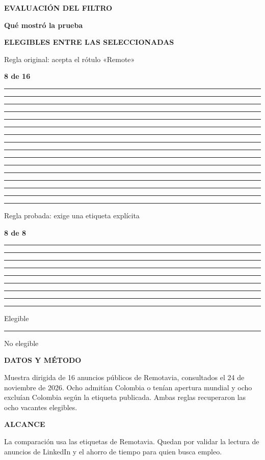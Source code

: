 \documentclass[a0,portrait]{a0poster}
\newcommand{\etiqueta}[2][uniRojo]{%
  {\sffamily\fontsize{28}{35}\selectfont\bfseries\color{#1}#2\par}}
\newcommand{\tituloSeccion}[1]{%
  {\rmfamily\fontsize{67}{74}\selectfont\bfseries\color{uniAzul}#1\par}}
\newcommand{\nota}[1]{%
  {\sffamily\fontsize{36}{48}\selectfont\color{secundario}#1\par}}
\newcommand{\panel}[2]{%
  \begingroup\setlength{\fboxsep}{1.5cm}%
  \noindent\colorbox{#1}{%
    \parbox[t]{\dimexpr\linewidth-2\fboxsep\relax}{\raggedright #2}}%
  \par\endgroup}
\newcommand{\segmento}[1]{%
  {\color{#1}\rule{1.43cm}{1.12cm}}\hspace{0.31cm}}
\newcommand{\ocho}[1]{%
  \segmento{#1}\segmento{#1}\segmento{#1}\segmento{#1}%
  \segmento{#1}\segmento{#1}\segmento{#1}\segmento{#1}}
\newcommand{\leyenda}[2]{%
  {\color{#1}\rule{0.7cm}{0.7cm}}\hspace{0.35cm}#2}
\begin{document}
\begin{minipage}[t]{0.443\linewidth}
  \vspace{0pt}\raggedright
  \etiqueta{EVALUACIÓN DEL FILTRO}
  \vspace{0.35cm}
  \tituloSeccion{Qué mostró la prueba}
  \vspace{1.1cm}
  \panel{azulClaro}{%
    \etiqueta[uniAzul]{ELEGIBLES ENTRE LAS SELECCIONADAS}
    \vspace{0.8cm}
    \nota{Regla original: acepta el rótulo «Remote»}
    \vspace{0.28cm}
    {\rmfamily\fontsize{76}{80}\selectfont\bfseries\color{uniAzul}
      8 de 16\par}
    \vspace{0.38cm}
    \ocho{uniAzul}\ocho{uniRojo}\par
    \vspace{1.2cm}
    \nota{Regla probada: exige una etiqueta explícita}
    \vspace{0.28cm}
    {\rmfamily\fontsize{76}{80}\selectfont\bfseries\color{uniAzul}
      8 de 8\par}
    \vspace{0.38cm}
    \ocho{uniAzul}\par
    \vspace{0.95cm}
    {\sffamily\fontsize{26}{33}\selectfont
      \leyenda{uniAzul}{Elegible}\hspace{1.5cm}%
      \leyenda{uniRojo}{No elegible}\par}
  }
  \vspace{1.35cm}
  \etiqueta{DATOS Y MÉTODO}
  \vspace{0.5cm}
  \nota{Muestra dirigida de 16 anuncios públicos de Remotavia, consultados el 24 de noviembre de 2026. Ocho admitían Colombia o tenían apertura mundial y ocho excluían Colombia según la etiqueta publicada. Ambas reglas recuperaron las ocho vacantes elegibles.}
  \vspace{1.05cm}
  \etiqueta{ALCANCE}
  \vspace{0.5cm}
  \nota{La comparación usa las etiquetas de Remotavia. Quedan por validar la lectura de anuncios de LinkedIn y el ahorro de tiempo para quien busca empleo.}
\end{minipage}\par
\end{document}
